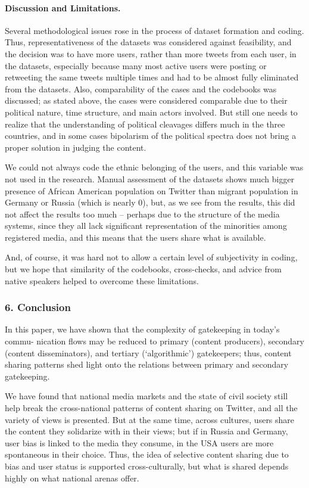 \paragraph{Discussion and Limitations.} Several methodological issues rose in the process of dataset formation and coding. Thus, representativeness of the datasets was considered against feasibility, and the decision was to have more users, rather than more tweets from each user, in the datasets, especially because many most active users were posting or retweeting the same tweets multiple times and had to be almost fully eliminated from the datasets. Also, comparability of the cases and the codebooks was discussed; as stated above, the cases were considered comparable due to their political nature, time structure, and main actors involved. But still one needs to realize that the understanding of political cleavages differs much in the three countries, and in some cases bipolarism of the political spectra does not bring a proper solution in judging the content.

We could not always code the ethnic belonging of the users, and this variable was not used in the research. Manual assessment of the datasets shows much bigger presence of African American population on Twitter than migrant population in Germany or Russia (which is nearly 0), but, as we see from the results, this did not affect the results too much -- perhaps due to the structure of the media systems, since they all lack significant representation of the minorities among registered media, and this means that the users share what is available.

And, of course, it was hard not to allow a certain level of subjectivity in coding, but we hope that similarity of the codebooks, cross-checks, and advice from native speakers helped to overcome these limitations.

\subsubsection{6. Conclusion}
In this paper, we have shown that the complexity of gatekeeping in today’s commu- nication flows may be reduced to primary (content producers), secondary (content disseminators), and tertiary (‘algorithmic’) gatekeepers; thus, content sharing patterns shed light onto the relations between primary and secondary gatekeeping.

We have found that national media markets and the state of civil society still help break the cross-national patterns of content sharing on Twitter, and all the variety of views is presented. But at the same time, across cultures, users share the content they solidarize with in their views; but if in Russia and Germany, user bias is linked to the media they consume, in the USA users are more spontaneous in their choice. Thus, the idea of selective content sharing due to bias and user status is supported cross-culturally, but what is shared depends highly on what national arenas offer.

\FloatBarrier
